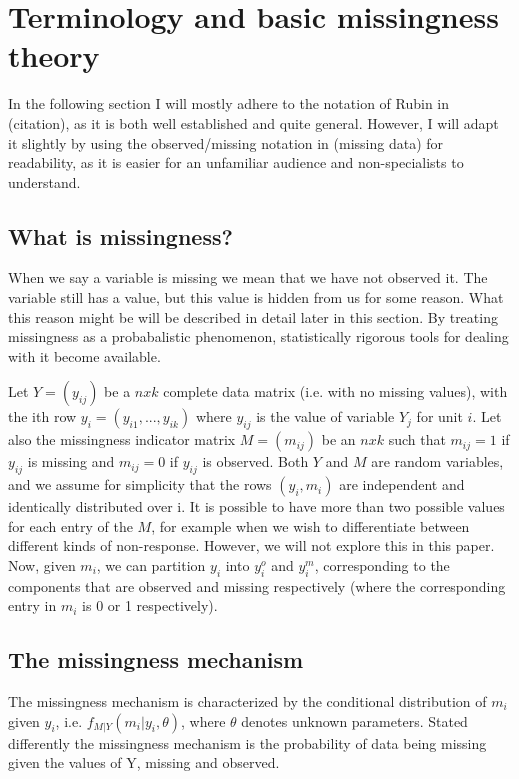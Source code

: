 \documentclass{article}
\begin{document}
	\section{Terminology and basic missingness theory}
	In the following section I will mostly adhere to the notation of Rubin in (citation), as it is both well established and quite general. However, I will adapt it slightly by using the observed/missing notation in (missing data) for readability, as it is easier for an unfamiliar audience and non-specialists to understand.
	
	\subsection{What is missingness?}
	When we say a variable is missing we mean that we have not observed it. The variable still has a value, but this value is hidden from us for some reason. What this reason might be will be described in detail later in this section. By treating missingness as a probabalistic phenomenon, statistically rigorous tools for dealing with it become available. 
	
	Let $Y=(y_{ij})$ be a $nxk$ complete data matrix (i.e. with no missing values), with the ith row $y_{i}=(y_{i1}, ..., y_{ik})$ where $y_{ij}$ is the value of variable $Y_{j}$ for unit $i$. Let also the missingness indicator matrix $M = (m_{ij})$ be an $nxk$ such that $m_{ij} = 1$ if $y_{ij}$ is missing and $m_{ij} = 0$ if $y_{ij}$ is observed. Both $Y$ and $M$ are random variables, and we assume for simplicity that the rows $(y_{i}, m_{i})$ are independent and identically distributed over i. It is possible to have more than two possible values for each entry of the $M$, for example when we wish to differentiate between different kinds of non-response. However, we will not explore this in this paper. Now, given $m_{i}$, we can partition $y_{i}$ into $y^{o}_{i}$ and $y^{m}_{i}$, corresponding to the components that are observed and missing respectively (where the corresponding entry in $m_{i}$ is 0 or 1 respectively).
	
	\subsection{The missingness mechanism}
	
	The missingness mechanism is characterized by the conditional distribution of $m_{i}$ given $y_{i}$, i.e. $f_{M|Y}(m_{i}|y_{i}, \theta)$, where $\theta$ denotes unknown parameters. Stated differently the missingness mechanism is the probability of data being missing given the values of Y, missing and observed. 
	
\end{document}
